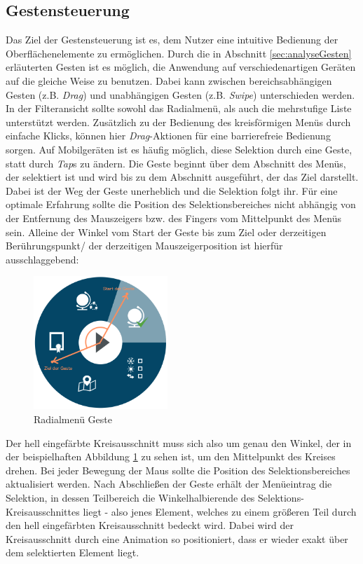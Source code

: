 \subsection{Gestensteuerung}
Das Ziel der Gestensteuerung ist es, dem Nutzer eine intuitive Bedienung der Oberflächenelemente zu ermöglichen. Durch die in Abschnitt \ref{sec:analyseGesten} erläuterten Gesten ist es möglich, die Anwendung auf verschiedenartigen Geräten auf die gleiche Weise zu benutzen. Dabei kann zwischen bereichsabhängigen Gesten (z.B. \textit{Drag}) und unabhängigen Gesten (z.B. \textit{Swipe}) unterschieden werden.
In der Filteransicht sollte sowohl das Radialmenü, als auch die mehrstufige Liste unterstützt werden. Zusätzlich zu der Bedienung des kreisförmigen Menüs durch einfache Klicks, können hier \textit{Drag}-Aktionen für eine barrierefreie Bedienung sorgen. Auf Mobilgeräten ist es häufig möglich, diese Selektion durch eine Geste, statt durch \textit{Tap}s zu ändern. Die Geste beginnt über dem Abschnitt des Menüs, der selektiert ist und wird bis zu dem Abschnitt ausgeführt, der das Ziel darstellt. Dabei ist der Weg der Geste unerheblich und die Selektion folgt ihr. Für eine optimale Erfahrung sollte die Position des Selektionsbereiches nicht abhängig von der Entfernung des Mauszeigers bzw. des Fingers vom Mittelpunkt des Menüs sein. Alleine der Winkel vom Start der Geste bis zum Ziel oder derzeitigen Berührungspunkt/ der derzeitigen Mauszeigerposition ist hierfür ausschlaggebend:\par
\begin{figure}[H]
 \centering
 \includegraphics[width=0.45\textwidth]{grafiken/radial_gesture.png}
 \caption{Radialmenü Geste}
 \label{fig:radialGesture}
\end{figure}
Der hell eingefärbte Kreisausschnitt muss sich also um genau den Winkel, der in der beispielhaften Abbildung \ref{fig:radialGesture} zu sehen ist, um den Mittelpunkt des Kreises drehen. Bei jeder Bewegung der Maus sollte die Position des Selektionsbereiches aktualisiert werden. Nach Abschließen der Geste erhält der Menüeintrag die Selektion, in dessen Teilbereich die Winkelhalbierende des Selektions-Kreisausschnittes liegt - also jenes Element, welches zu einem größeren Teil durch den hell eingefärbten Kreisausschnitt bedeckt wird. Dabei wird der Kreisausschnitt durch eine Animation so positioniert, dass er wieder exakt über dem selektierten Element liegt. \par
